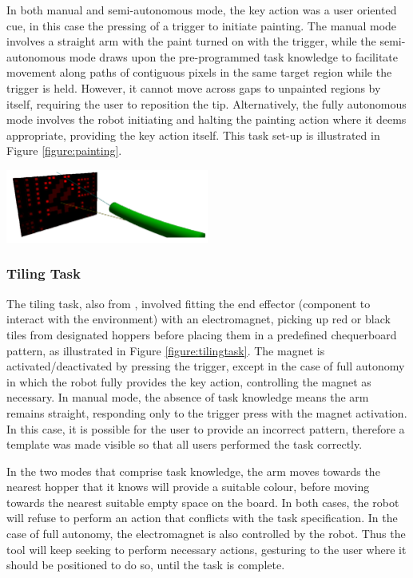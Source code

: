\documentclass[11pt]{article}
\begin{document}
In both manual and semi-autonomous mode, the key action was a user oriented cue, in this case the pressing of a trigger to initiate painting. The manual mode involves a straight arm with the paint turned on with the trigger, while the semi-autonomous mode draws upon the pre-programmed task knowledge to facilitate movement along paths of contiguous pixels in the same target region while the trigger is held. However, it cannot move across gaps to unpainted regions by itself, requiring the user to reposition the tip. Alternatively, the fully autonomous mode involves the robot initiating and halting the painting action where it deems appropriate, providing the key action itself. This task set-up is illustrated in Figure \ref{figure:painting}.

\begin{center}
\includegraphics[width=0.5\textwidth]{painting.png}
\label{figure:painting}
\end{center}

\subsubsection{Tiling Task}
The tiling task, also from \cite{GreggSmithDesign}, involved fitting the end effector (component to interact with the environment) with an electromagnet, picking up red or black tiles from designated hoppers before placing them in a predefined chequerboard pattern, as illustrated in Figure \ref{figure:tilingtask}. The magnet is activated/deactivated by pressing the trigger, except in the case of full autonomy in which the robot fully provides the key action, controlling the magnet as necessary. In manual mode, the absence of task knowledge means the arm remains straight, responding only to the trigger press with the magnet activation. In this case, it is possible for the user to provide an incorrect pattern, therefore a template was made visible so that all users performed the task correctly. 

In the two modes that comprise task knowledge, the arm moves towards the nearest hopper that it knows will provide a suitable colour, before moving towards the nearest suitable empty space on the board. In both cases, the robot will refuse to perform an action that conflicts with the task specification. In the case of full autonomy, the electromagnet is also controlled by the robot. Thus the tool will keep seeking to perform necessary actions, gesturing to the user where it should be positioned to do so, until the task is complete.
\end{document}
